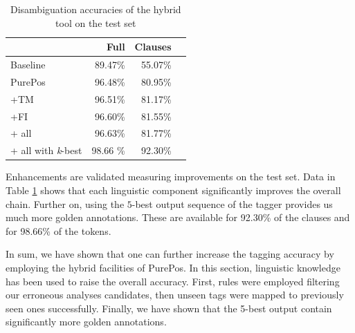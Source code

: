 \begin{table}[H]
\centering
\caption{Disambiguation accuracies of the hybrid tool on the test set}
\label{tab:oldhun-test}
\begin{tabular}{l r r r}
\hline
 & Full & Clauses  \\
\hline
Baseline  & 89.47\% & 55.07\% \\
PurePos  & 96.48\% & 80.95\% \\
+TM  & 96.51\% & 81.17\% \\
+FI  & 96.60\% & 81.55\% \\
+ all  & 96.63\% & 81.77\% \\
+ all with \emph{k}-best  & 98.66 \% & 92.30\% \\
\hline
\end{tabular}
\end{table}
 
Enhancements are validated measuring improvements on the test set.
Data in Table \ref{tab:oldhun-test} shows that each linguistic component significantly improves the overall chain.
Further on, using the $5$-best output sequence of the tagger provides us much more golden annotations. 
These are available for 92.30\% of the clauses and for 98.66\% of the tokens.

In sum, we have shown that one can further increase the tagging accuracy by employing the hybrid facilities of PurePos. 
In this section, linguistic knowledge has been used to raise the overall accuracy.
First, rules were employed filtering our erroneous analyses candidates, then unseen tags were mapped to previously seen ones successfully. 
Finally, we have shown that the 5-best output contain significantly more golden annotations.



